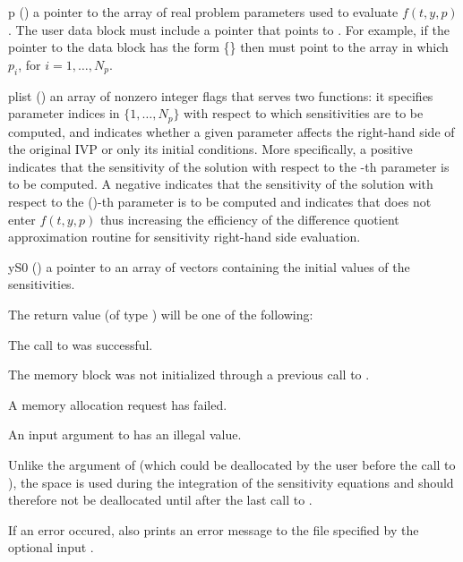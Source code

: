 {\begin{args}
  \item[p] ()
    a pointer to the array of real problem parameters used to evaluate $f(t,y,p)$.
    The user data block  must include a  pointer
    that points to . For example, if the pointer to the data block has the 
    form \{\} 
    then  must point to the array in which 
     $p_i$, for $i=1,\ldots,N_p$.
    
  \item[plist] () 
    an array of  nonzero integer flags that serves two functions:
    it specifies parameter indices in $\{1,\ldots,N_p\}$  
    with respect to which sensitivities are to be computed,
    and indicates whether a given parameter affects the right-hand side of the original
    IVP or only its initial conditions.
    More specifically, a positive  indicates that the sensitivity
    of the solution with respect to the -th parameter  is to be computed.
    A negative  indicates that the sensitivity of the solution with
    respect to the ()-th parameter  is to be computed and indicates
    that  does not enter $f(t,y,p)$ thus increasing the efficiency of the
    difference quotient approximation routine for sensitivity right-hand side evaluation.
    
  \item[yS0] () 
    a pointer to an array of  vectors containing the initial 
    values of the sensitivities.

  \end{args}
}
{
  The return value  (of type ) will be one of the following:
  \begin{args}
  \item[\Id{CV\_SUCCESS}]
    The call to  was successful.
  \item[\Id{CV\_MEM\_NULL}] 
    The {\cvodes} memory block was not initialized through a 
    previous call to .
  \item[\Id{CV\_MEM\_FAIL}] 
    A memory allocation request has failed.
  \item[\Id{CV\_ILL\_INPUT}] 
    An input argument to  has an illegal value.
  \end{args}
}
{
  Unlike the argument  of  (which could be deallocated
  by the user before the call to ), the space  is used during the
  integration of the sensitivity equations and should therefore not be deallocated 
  until after the last call to .

  If an error occured,  also prints an error message to the
  file specified by the optional input .
}
